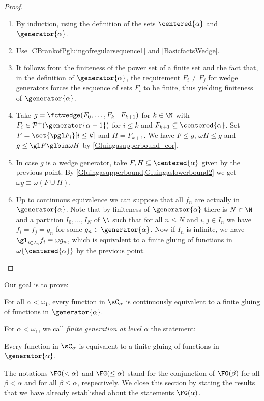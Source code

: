 \begin{proof}%
\begin{enumerate}
\item By induction, using the definition of the sets $\centered{\alpha}$ and $\generator{\alpha}$.
\item Use \cref{CBrankofPgluingofregularsequence1} and \cref{BasicfactsWedge}.
\item It follows from the finiteness of the power set of a finite set and the fact that, in the definition of $\generator{\alpha}$, the requirement $F_i\neq F_j$
for wedge generators forces the sequence of sets $F_i$ to be finite, thus yielding finiteness of $\generator{\alpha}$.
\item Take $g=\fctwedge(F_0,\ldots, F_k \mid F_{k+1})$ for $k\in\N$ with $F_i\in\mathcal{P}^+(\generator{\alpha-1})$ for $i\leq k$ and $F_{k+1}\subseteq\centered{\alpha}$.
Set $F=\set{\pgl F_i}[i\leq k]$ and $H=F_{k+1}$. We have $F\leq g$, $\omega H\leq g$ and $g\leq\gl F\glbin \omega H$ by \cref{Gluingasupperbound_cor}.

\item In case $g$ is a wedge generator, take $F,H\subseteq \centered{\alpha}$ given by the previous point. By \cref{Gluingasupperbound,Gluingaslowerbound2} we get $\omega g\equiv \omega (F\cup H)$.

\item Up to continuous equivalence we can suppose that all $f_n$ are actually in $\generator{\alpha}$.
Note that by finiteness of $\generator{\alpha}$ there is $N\in\N$ and a partition $I_0,\ldots,I_N$ of $\N$ such that for all $n\leq N$ and $i,j\in I_n$
we have $f_i=f_j=g_n$ for some $g_n\in\generator{\alpha}$.
Now if $I_n$ is infinite, we have $\gl_{i\in I_n}f_i\equiv \omega g_n$, which is equivalent to a finite gluing of functions in $\omega \{\centered{\alpha}\}$ by the previous point.
\qedhere
\end{enumerate}
\end{proof}


Our goal is to prove:

\begin{theorem}\label{PreciseStructureThm}
For all $\alpha<\omega_1$, every function in $\sC_\alpha$ is continuously equivalent to a finite gluing of functions in $\generator{\alpha}$.
\end{theorem}

For $\alpha<\omega_1$, we call \emph{finite generation at level $\alpha$} the statement:
\begin{descThm}
\item[$\FG(\alpha)$] Every function in $\sC_\alpha$ is equivalent to a finite gluing of functions in $\generator{\alpha}$.
\end{descThm}
The notations $\FG(<\alpha)$ and $\FG(\leq\alpha)$ stand for the conjunction of $\FG(\beta)$ for all $\beta<\alpha$ and for all $\beta\leq\alpha$, respectively.
We close this section by stating the results that we have already established about the statements $\FG(\alpha)$.


